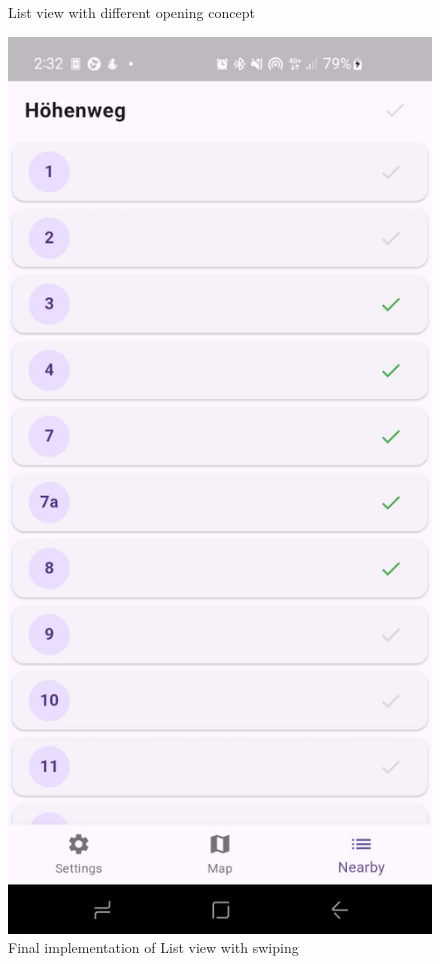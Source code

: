 \begin{figure}[H]
\begin{minipage}{0.26\textwidth}
        \caption{List view with different opening concept}
    \end{minipage}
    \hspace{0.3cm}
    \begin{minipage}{0.26\textwidth}
        \centering
        \includegraphics[width=\textwidth]{images/paul/wireframes/finalList.jpeg}
        \caption{Final implementation of List view with swiping}
    \end{minipage}
\end{figure}

